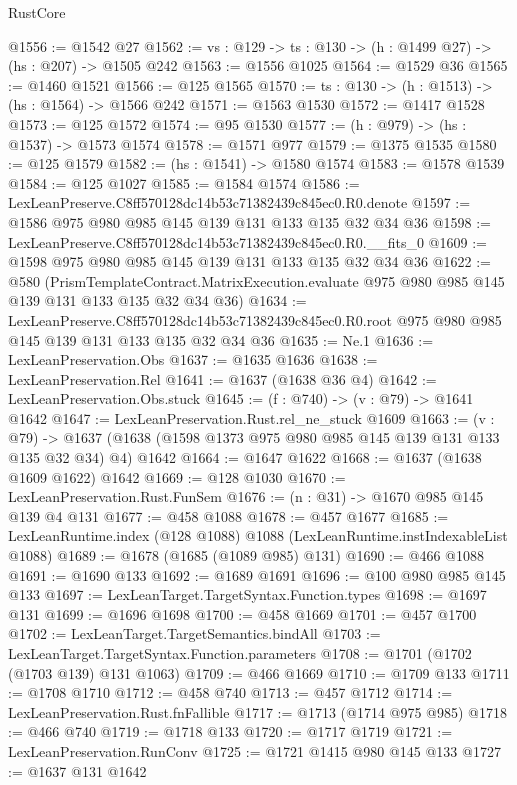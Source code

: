 \begin{lexlean}{RustCore}
\begin{coremodule}
@1556 := @1542 @27
@1562 := {vs : @129} -> {ts : @130} -> (h : @1499 @27) -> (hs : @207) -> @1505 @242
@1563 := @1556 @1025
@1564 := @1529 @36
@1565 := @1460 @1521
@1566 := @125 @1565
@1570 := {ts : @130} -> (h : @1513) -> (hs : @1564) -> @1566 @242
@1571 := @1563 @1530
@1572 := @1417 @1528
@1573 := @125 @1572
@1574 := @95 @1530
@1577 := (h : @979) -> (hs : @1537) -> @1573 @1574
@1578 := @1571 @977
@1579 := @1375 @1535
@1580 := @125 @1579
@1582 := (hs : @1541) -> @1580 @1574
@1583 := @1578 @1539
@1584 := @125 @1027
@1585 := @1584 @1574
@1586 := LexLeanPreserve.C8ff570128dc14b53c71382439c845ec0.R0.denote
@1597 := @1586 @975 @980 @985 @145 @139 @131 @133 @135 @32 @34 @36
@1598 := LexLeanPreserve.C8ff570128dc14b53c71382439c845ec0.R0.__fits_0
@1609 := @1598 @975 @980 @985 @145 @139 @131 @133 @135 @32 @34 @36
@1622 := @580
    (PrismTemplateContract.MatrixExecution.evaluate
      @975
      @980
      @985
      @145
      @139
      @131
      @133
      @135
      @32
      @34
      @36)
@1634 := LexLeanPreserve.C8ff570128dc14b53c71382439c845ec0.R0.root
    @975
    @980
    @985
    @145
    @139
    @131
    @133
    @135
    @32
    @34
    @36
@1635 := Ne.{1}
@1636 := LexLeanPreservation.Obs
@1637 := @1635 @1636
@1638 := LexLeanPreservation.Rel
@1641 := @1637 (@1638 @36 @4)
@1642 := LexLeanPreservation.Obs.stuck
@1645 := (f : @740) -> (v : @79) -> @1641 @1642
@1647 := LexLeanPreservation.Rust.rel_ne_stuck @1609
@1663 := (v : @79) ->
  @1637 (@1638 (@1598 @1373 @975 @980 @985 @145 @139 @131 @133 @135 @32 @34) @4) @1642
@1664 := @1647 @1622
@1668 := @1637 (@1638 @1609 @1622) @1642
@1669 := @128 @1030
@1670 := LexLeanPreservation.Rust.FunSem
@1676 := (n : @31) -> @1670 @985 @145 @139 @4 @131
@1677 := @458 @1088
@1678 := @457 @1677
@1685 := LexLeanRuntime.index (@128 @1088) @1088 (LexLeanRuntime.instIndexableList @1088)
@1689 := @1678 (@1685 (@1089 @985) @131)
@1690 := @466 @1088
@1691 := @1690 @133
@1692 := @1689 @1691
@1696 := @100 @980 @985 @145 @133
@1697 := LexLeanTarget.TargetSyntax.Function.types
@1698 := @1697 @131
@1699 := @1696 @1698
@1700 := @458 @1669
@1701 := @457 @1700
@1702 := LexLeanTarget.TargetSemantics.bindAll
@1703 := LexLeanTarget.TargetSyntax.Function.parameters
@1708 := @1701 (@1702 (@1703 @139) @131 @1063)
@1709 := @466 @1669
@1710 := @1709 @133
@1711 := @1708 @1710
@1712 := @458 @740
@1713 := @457 @1712
@1714 := LexLeanPreservation.Rust.fnFallible
@1717 := @1713 (@1714 @975 @985)
@1718 := @466 @740
@1719 := @1718 @133
@1720 := @1717 @1719
@1721 := LexLeanPreservation.RunConv
@1725 := @1721 @1415 @980 @145 @133
@1727 := @1637 @131 @1642

\end{coremodule}
\end{lexlean}
